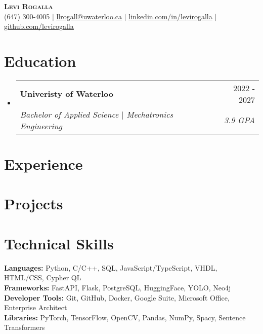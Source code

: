 \documentclass[letterpaper,11pt]{article}
\makeatletter
\newcommand{\resumeSubheading}[4]{
	\vspace{-2pt}\item
	\begin{tabular*}{0.97\textwidth}[t]{l@{\extracolsep{\fill}}r}
		\textbf{#1} & #2 \\
		\textit{\small#3} & \textit{\small #4} \\
	\end{tabular*}\vspace{-7pt}
}
\newcommand{\resumeSubHeadingListStart}{\begin{itemize}[leftmargin=0.15in, label={}]}
\newcommand{\resumeSubHeadingListEnd}{\end{itemize}}
\makeatother
\begin{document}
	
	
	\begin{center}
		\textbf{\Huge \scshape Levi Rogalla} \\ \vspace{1pt}
		\small (647) 300-4005 $|$ \href{mailto:llrogall@uwaterloo.ca}{\underline{llrogall@uwaterloo.ca}} $|$ 
		\href{https://linkedin.com/in/levirogalla}{\underline{linkedin.com/in/levirogalla}} $|$
		\href{https://github.com/levirogalla}{\underline{github.com/levirogalla}}
	\end{center}
	
	
	\section{Education}
	\resumeSubHeadingListStart
	\resumeSubheading
	{Univeristy of Waterloo}{2022 - 2027}
	{Bachelor of Applied Science $|$ Mechatronics Engineering}{3.9 GPA}
	\resumeSubHeadingListEnd
	
	
	\section{Experience}
	\resumeSubHeadingListStart


	\resumeSubHeadingListEnd
	\section{Projects} 
	\resumeSubHeadingListStart


	\resumeSubHeadingListEnd
	\section{Technical Skills}
	\begin{itemize}[leftmargin=0.15in, label={}]
		\small{\item{
				\textbf{Languages: }{Python, C/C++, SQL, JavaScript/TypeScript, VHDL, HTML/CSS, Cypher QL} \\
				\textbf{Frameworks: }{FastAPI, Flask, PostgreSQL, HuggingFace, YOLO, Neo4j} \\
				\textbf{Developer Tools: }{Git, GitHub, Docker, Google Suite, Microsoft Office, Enterprise Architect} \\
				\textbf{Libraries: }{PyTorch, TensorFlow, OpenCV, Pandas, NumPy, Spacy, Sentence Transformers}
		}}
	\end{itemize}
	
\end{document}
